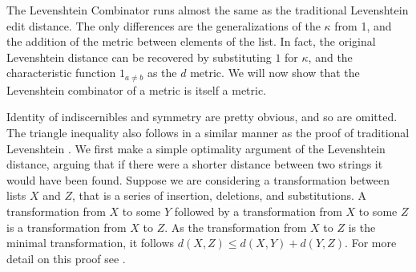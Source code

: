 The Levenshtein Combinator runs almost the same as the traditional Levenshtein edit distance.
The only differences are the generalizations of the $\kappa$ from 1,
and the addition of the metric between elements of the list.
In fact, the original Levenshtein distance can be recovered by substituting $1$ for $\kappa$,
and the characteristic function $1_{a \neq b}$ as the $d$ metric.
We will now show that the Levenshtein combinator of a metric is itself a metric. 

Identity of indiscernibles and symmetry are pretty obvious, and so are omitted.
The triangle inequality also follows in a similar manner as the proof of traditional Levenshtein \cite{j2kun_2014}.
We first make a simple optimality argument of the Levenshtein distance,
arguing that if there were a shorter distance between two strings it would have been found.
Suppose we are considering a transformation between lists $X$ and $Z$,
that is a series of insertion, deletions, and substitutions.
A transformation from $X$ to some $Y$ followed by a transformation from $X$ to some $Z$
is a transformation from $X$ to $Z$.
As the transformation from $X$ to $Z$ is the minimal transformation,
it follows $d(X, Z) \le d(X, Y) + d(Y, Z)$.
For more detail on this proof see \cite{wiki:levenshtein}.